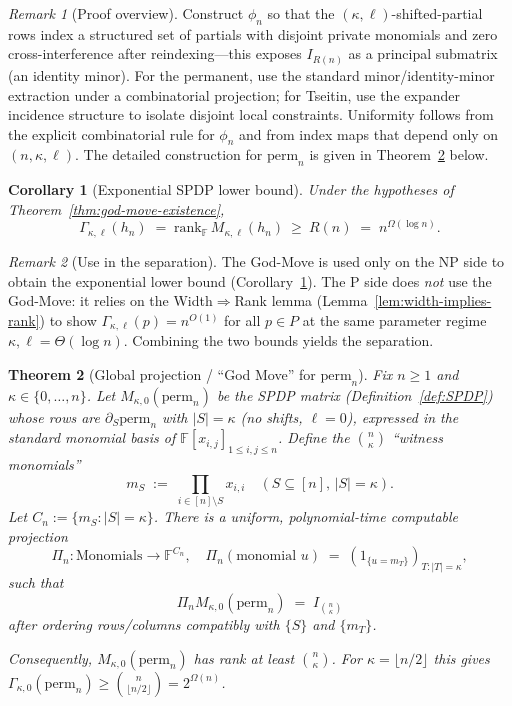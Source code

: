 \documentclass[12pt]{article}
\newtheorem{theorem}{Theorem}
\newtheorem{corollary}[theorem]{Corollary}
\theoremstyle{definition}
\theoremstyle{definition}
\theoremstyle{remark}
\newtheorem{remark}{Remark}
\theoremstyle{remark}
\begin{document}
\begin{remark}[Proof overview]
Construct $\phi_n$ so that the $(\kappa,\ell)$-shifted-partial rows index a structured set of partials with disjoint private monomials and zero cross-interference after reindexing---this exposes $I_{R(n)}$ as a principal submatrix (an identity minor). For the permanent, use the standard minor/identity-minor extraction under a combinatorial projection; for Tseitin, use the expander incidence structure to isolate disjoint local constraints. Uniformity follows from the explicit combinatorial rule for $\phi_n$ and from index maps that depend only on $(n,\kappa,\ell)$. The detailed construction for $\mathrm{perm}_n$ is given in Theorem~\ref{thm:god-move} below.
\end{remark}

\begin{corollary}[Exponential SPDP lower bound]\label{cor:god-move-lb}
Under the hypotheses of Theorem~\ref{thm:god-move-existence},
\[
\Gamma_{\kappa,\ell}(h_n)\;=\;\mathrm{rank}_{\mathbb{F}}\, M_{\kappa,\ell}(h_n)\ \ge\ R(n)\;=\; n^{\Omega(\log n)}.
\]
\end{corollary}

\begin{remark}[Use in the separation]
The God-Move is used only on the NP side to obtain the exponential lower bound (Corollary~\ref{cor:god-move-lb}).
The P side does \emph{not} use the God-Move: it relies on the Width$\Rightarrow$Rank lemma (Lemma~\ref{lem:width-implies-rank}) to show
$\Gamma_{\kappa,\ell}(p)=n^{O(1)}$ for all $p\in P$ at the same parameter regime $\kappa,\ell=\Theta(\log n)$.
Combining the two bounds yields the separation.
\end{remark}


\begin{theorem}[Global projection / ``God Move'' for $\mathrm{perm}_n$]\label{thm:god-move}
Fix $n \geq 1$ and $\kappa \in \{0,\ldots,n\}$. Let $M_{\kappa,0}(\mathrm{perm}_n)$ be the SPDP matrix (Definition~\ref{def:SPDP}) whose rows are $\partial_S \mathrm{perm}_n$ with $|S| = \kappa$ (no shifts, $\ell = 0$), expressed in the standard monomial basis of $\mathbb{F}[x_{i,j}]_{1 \leq i,j \leq n}$. Define the $\binom{n}{\kappa}$ ``witness monomials''
\[
m_S \;:=\; \prod_{i \in [n] \setminus S} x_{i,i} \quad (S \subseteq [n],\, |S| = \kappa).
\]
Let $C_n := \{m_S : |S| = \kappa\}$. There is a uniform, polynomial-time computable projection
\[
\Pi_n : \text{Monomials} \longrightarrow \mathbb{F}^{C_n}, \quad \Pi_n(\text{monomial } u) \;=\; (1_{\{u = m_T\}})_{T : |T| = \kappa},
\]
such that
\[
\Pi_n M_{\kappa,0}(\mathrm{perm}_n) \;=\; I_{\binom{n}{\kappa}}
\]
after ordering rows/columns compatibly with $\{S\}$ and $\{m_T\}$.

Consequently, $M_{\kappa,0}(\mathrm{perm}_n)$ has rank at least $\binom{n}{\kappa}$. For $\kappa = \lfloor n/2 \rfloor$ this gives $\Gamma_{\kappa,0}(\mathrm{perm}_n) \geq \binom{n}{\lfloor n/2 \rfloor} = 2^{\Omega(n)}$.
\end{theorem}
\end{document}
